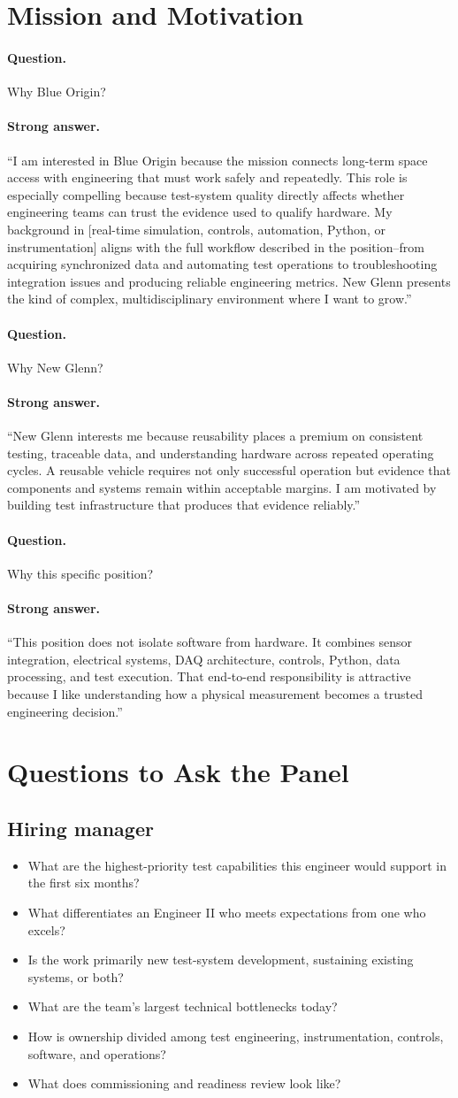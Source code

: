 \documentclass[11pt]{article}
\newcommand{\q}[1]{\paragraph{Question.} #1}
\newcommand{\ans}[1]{\paragraph{Strong answer.} #1}
\begin{document}
\section{Mission and Motivation}

\q{Why Blue Origin?}
\ans{``I am interested in Blue Origin because the mission connects long-term space
access with engineering that must work safely and repeatedly. This role is
especially compelling because test-system quality directly affects whether
engineering teams can trust the evidence used to qualify hardware. My background
in [real-time simulation, controls, automation, Python, or instrumentation]
aligns with the full workflow described in the position--from acquiring
synchronized data and automating test operations to troubleshooting integration
issues and producing reliable engineering metrics. New Glenn presents the kind
of complex, multidisciplinary environment where I want to grow.''}

\q{Why New Glenn?}
\ans{``New Glenn interests me because reusability places a premium on consistent
testing, traceable data, and understanding hardware across repeated operating
cycles. A reusable vehicle requires not only successful operation but evidence
that components and systems remain within acceptable margins. I am motivated by
building test infrastructure that produces that evidence reliably.''}

\q{Why this specific position?}
\ans{``This position does not isolate software from hardware. It combines sensor
integration, electrical systems, DAQ architecture, controls, Python, data
processing, and test execution. That end-to-end responsibility is attractive
because I like understanding how a physical measurement becomes a trusted
engineering decision.''}

\section{Questions to Ask the Panel}

\subsection{Hiring manager}
\begin{itemize}
  \item What are the highest-priority test capabilities this engineer would support in the first six months?
  \item What differentiates an Engineer II who meets expectations from one who excels?
  \item Is the work primarily new test-system development, sustaining existing systems, or both?
  \item What are the team's largest technical bottlenecks today?
  \item How is ownership divided among test engineering, instrumentation, controls, software, and operations?
  \item What does commissioning and readiness review look like?
\end{itemize}
\end{document}
